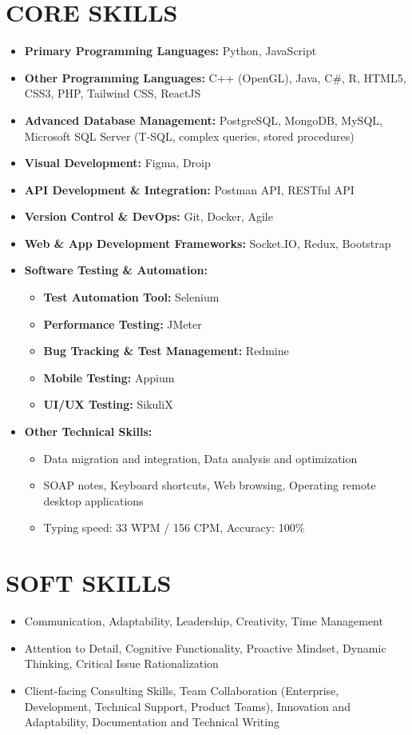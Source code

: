 \documentclass[a4paper,12pt]{article}
\begin{document}
\section*{CORE SKILLS}
\begin{itemize}[label=-]
    \item \textbf{Primary Programming Languages:} Python, JavaScript
    \item \textbf{Other Programming Languages:} C++ (OpenGL), Java, C\#, R, HTML5, CSS3, PHP, Tailwind CSS, ReactJS
    \item \textbf{Advanced Database Management:} PostgreSQL, MongoDB, MySQL, Microsoft SQL Server (T-SQL, complex queries, stored procedures)
    \item \textbf{Visual Development:} Figma, Droip
    \item \textbf{API Development \& Integration:} Postman API, RESTful API
    \item \textbf{Version Control \& DevOps:} Git, Docker, Agile
    \item \textbf{Web \& App Development Frameworks:} Socket.IO, Redux, Bootstrap
    \item \textbf{Software Testing \& Automation:}  
    \begin{itemize}
        \item \textbf{Test Automation Tool:} Selenium
        \item \textbf{Performance Testing:} JMeter
        \item \textbf{Bug Tracking \& Test Management:} Redmine
        \item \textbf{Mobile Testing:} Appium
        \item \textbf{UI/UX Testing:} SikuliX
    \end{itemize}
    \item \textbf{Other Technical Skills:}
    \begin{itemize}
        \item Data migration and integration, Data analysis and optimization
        \item SOAP notes, Keyboard shortcuts, Web browsing, Operating remote desktop applications
        \item Typing speed: 33 WPM / 156 CPM, Accuracy: 100\%
    \end{itemize}
\end{itemize}

\section*{SOFT SKILLS}
\begin{itemize}[label=-]
        \item Communication, Adaptability, Leadership, Creativity, Time Management
        \item Attention to Detail, Cognitive Functionality, Proactive Mindset, Dynamic Thinking, Critical Issue Rationalization
        \item Client-facing Consulting Skills, Team Collaboration (Enterprise, Development, Technical Support, Product Teams), Innovation and Adaptability, Documentation and Technical Writing
\end{itemize}
\end{document}
